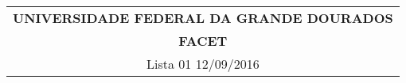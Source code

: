 \documentclass[a4paper,5pt]{amsbook}
\numberwithin{equation}{chapter}
\begin{document}
\thispagestyle{empty}
\begin{minipage}[b]{0.45\linewidth}
\begin{tabular}{c}
\hline \hline
{{\bf UNIVERSIDADE FEDERAL DA GRANDE DOURADOS}}\\

{{\bf FACET}} \\

\hline
Lista 01\hspace{12cm}  12/09/2016  \\
\hline \hline
\end{tabular}
%
\end{minipage} 

\vspace{0.2cm}
\end{document}

